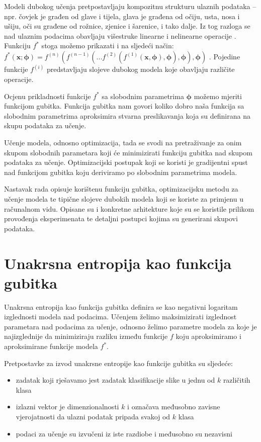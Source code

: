 \documentclass[times, utf8, diplomski, numeric]{fer}
\begin{document}
Modeli dubokog učenja pretpostavljaju kompozitnu strukturu ulaznih podataka -- npr. čovjek je građen od glave i tijela, glava je građena od očiju, usta, nosa i ušiju, oči su građene od rožnice, zjenice i šarenice, i tako dalje.
Iz tog razloga se nad ulaznim podacima obavljaju višestruke linearne i nelinearne operacije \citep{pdf:duboko_0}.
Funkciju $f^*$ stoga možemo prikazati i na sljedeći način:
$f^*(\mathbf{x}; \boldsymbol{\phi})=f^{(n)}(f^{(n-1)}(...f^{(2)}(f^{(1)}(\mathbf{x}, \boldsymbol{\phi}), \boldsymbol{\phi}), \boldsymbol{\phi}), \boldsymbol{\phi})$ \citep{book:deeplearningbook}.
Pojedine funkcije $f^{(i)}$ predstavljaju slojeve dubokog modela koje obavljaju različite operacije.

Ocjenu prikladnosti funkcije $f^*$ sa slobodnim parametrima $\boldsymbol{\phi}$ možemo mjeriti funkcijom gubitka. 
Funkcija gubitka nam govori koliko dobro naša funkcija sa slobodnim parametrima aproksimira stvarna preslikavanja koja su definirana na skupu podataka za učenje.

Učenje modela, odnosno optimizacija, tada se svodi na pretraživanje za onim skupom slobodnih parametara koji će minimizirati funkciju gubitka nad skupom podataka za učenje.
Optimizacijski postupak koji se koristi je gradijentni spust nad funkcijom gubitka koju deriviramo po slobodnim parametrima modela.

Nastavak rada opisuje korištenu funkciju gubitka, optimizacijsku metodu za učenje modela te tipične slojeve dubokih modela koji se koriste za primjenu u računalnom vidu.
Opisane su i konkretne arhitekture koje su se koristile prilikom provođenja eksperimenata te detaljni postupci kojima su generirani skupovi podataka.

\section{Unakrsna entropija kao funkcija gubitka}
Unakrsna entropija kao funkcija gubitka definira se kao negativni logaritam izglednosti modela nad podacima. Učenjem želimo maksimizirati izglednost parametara nad podacima za učenje, odnosno želimo parametre modela za koje je najizglednije da minimiziraju razliku između funkcije $f$ koju aproksimiramo i aproksimirane funkcije modela $f^*$.

Pretpostavke za izvod unakrsne entropije kao funkcije gubitka su sljedeće:
\begin{itemize}
 \item zadatak koji rješavamo jest zadatak klasifikacije slike u jednu od $k$ različitih klasa
 \item izlazni vektor je dimenzionalnosti $k$ i označava međusobno zavisne vjerojatnosti da ulazni podatak pripada svakoj od $k$ klasa
 \item podaci za učenje su izvučeni iz iste razdiobe i međusobno su nezavisni
\end{itemize}
\end{document}
